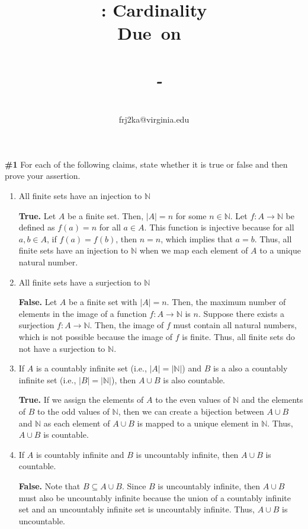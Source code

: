 \documentclass{article}
\title{
    \vspace{2in}
    \textmd{\textbf{\hmwkTitle: Cardinality}}\\
    \normalsize\vspace{0.1in}
    \small{\textbf{Due\ on\ \hmwkDueDate}}\\
    \normalsize\text{Tuesday/Thursday 11:00-12:15, Warner 209}\\
    \vspace{0.1in}\large{\textit{\hmwkClassInstructor\ - \hmwkClassTime}}
    \vspace{3in}
}
\author{\hmwkAuthorName\\\small{frj2ka@virginia.edu}}
\date{}
\newcommand{\problem}[1]{\textbf{\##1}}
\newcommand{\union}{\cup}
\newcommand{\AllNaturals}{\mathbb{N}}
\begin{document}
\maketitle

\pagebreak

\problem{1} For each of the following claims, state whether it is true or false and then prove your assertion.

\begin{enumerate}
    \item All finite sets have an injection to \(\AllNaturals\)
    
    \textbf{True.} Let \(A\) be a finite set. Then, \(|A| = n\) for some \(n \in \AllNaturals\). Let \(f: A \to \AllNaturals\) be defined as \(f(a) = n\) for all \(a \in A\). This function is injective because for all \(a, b \in A\), if \(f(a) = f(b)\), then \(n = n\), which implies that \(a = b\). Thus, all finite sets have an injection to \(\AllNaturals\) when we map each element of \(A\) to a unique natural number.

    \item All finite sets have a surjection to \(\AllNaturals\)
    
    \textbf{False.} Let \(A\) be a finite set with \(|A| = n\). Then, the maximum number of elements in the image of a function \(f: A \to \AllNaturals\) is \(n\). Suppose there exists a surjection \(f: A \to \AllNaturals\). Then, the image of \(f\) must contain all natural numbers, which is not possible because the image of \(f\) is finite. Thus, all finite sets do not have a surjection to \(\AllNaturals\).

    \item If \(A\) is a countably infinite set (i.e., \(|A| = |\AllNaturals|\)) and \(B\) is a also a countably infinite set (i.e., \(|B| = |\AllNaturals|\)), then \(A \union B\) is also countable.
    
    \textbf{True.} If we assign the elements of \(A\) to the even values of \(\AllNaturals\) and the elements of \(B\) to the odd values of \(\AllNaturals\), then we can create a bijection between \(A \union B\) and \(\AllNaturals\) as each element of \(A \union B\) is mapped to a unique element in \(\AllNaturals\). Thus, \(A \union B\) is countable.

    \item If \(A\) is countably infinite and \(B\) is uncountably infinite, then \(A \union B\) is countable.
    
    \textbf{False.} Note that \(B \subseteq A \union B\). Since \(B\) is uncountably infinite, then \(A \union B\) must also be uncountably infinite because the union of a countably infinite set and an uncountably infinite set is uncountably infinite. Thus, \(A \union B\) is uncountable.


\end{enumerate}
\end{document}
